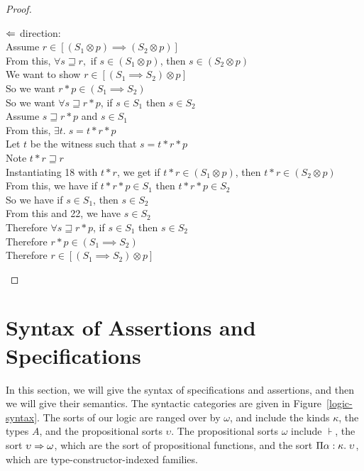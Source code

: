 \begin{proof}
\begin{tabbedproof}
\ooo $\Leftarrow$ direction: \\
\oooo Assume $r \in [(S_1 \otimes p) \implies (S_2 \otimes p)]$ \\
\ooooo From this, $\forall s \sqsupseteq r,$ if $s \in (S_1 \otimes p)$, then $s \in (S_2 \otimes p)$ \\
\ooooo We want to show $r \in [(S_1 \implies S_2) \otimes p]$ \\
\ooooo So we want $r * p \in (S_1 \implies S_2)$ \\
\ooooo So we want $\forall s \sqsupseteq r * p$, if $s \in S_1$ then $s \in S_2$ \\
\ooooo Assume $s \sqsupseteq r * p$ and $s \in S_1$ \\
\oooooo From this, $\exists t.\; s = t * r * p$ \\
\oooooo Let $t$ be the witness such that $s = t * r * p$ \\ 
\ooooooo Note $t * r \sqsupseteq r$ \\
\ooooooo Instantiating 18 with $t * r$, we get if $t * r \in (S_1 \otimes p)$, then $t * r \in (S_2 \otimes p)$ \\
\ooooooo From this, we have if $t * r * p \in S_1$ then $t * r * p \in S_2$ \\
\ooooooo So we have if $s \in S_1$, then $s \in S_2$ \\
\ooooooo From this and 22, we have $s \in S_2$ \\
\ooooo Therefore $\forall s \sqsupseteq r * p$, if $s \in S_1$ then $s \in S_2$ \\
\ooooo Therefore $r * p \in (S_1 \implies S_2)$ \\
\ooooo Therefore $r \in [(S_1 \implies S_2) \otimes p]$ 
\end{tabbedproof}
\end{proof}

\section{Syntax of Assertions and Specifications}

In this section, we will give the syntax of specifications and
assertions, and then we will give their semantics. The syntactic
categories are given in Figure~\ref{logic-syntax}. The sorts of our
logic are ranged over by $\omega$, and include the kinds $\kappa$, the
types $A$, and the propositional sorts $\upsilon$.  The propositional
sorts $\omega$ include $\assert$, the sort $\upsilon \Rightarrow \omega$,
which are the sort of propositional functions, and the sort
$\Pi {\alpha}:{\kappa}.\;{\upsilon}$, which are
type-constructor-indexed families.
 

